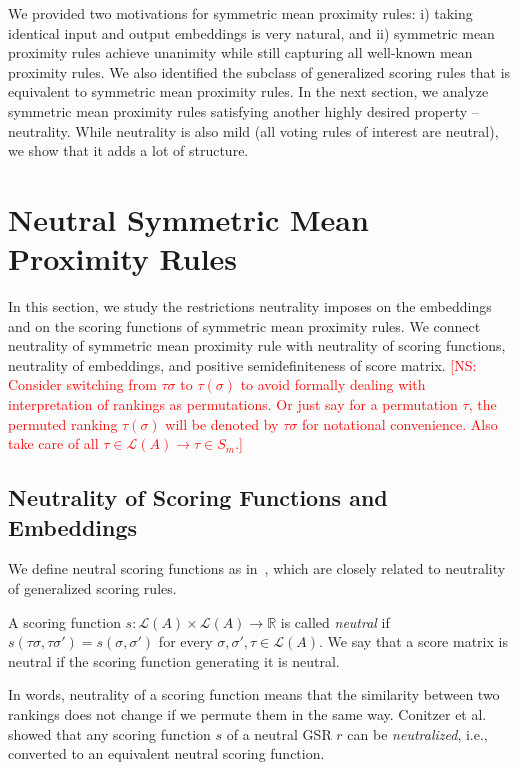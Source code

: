 \documentclass[10pt,letterpaper]{article}
\newcommand{\calL}{{\mathcal{L}}}
\newcommand{\rank}{{\calL(A)}}
\newenvironment{definition}[1][Definition]{\begin{trivlist}
\item[\hskip \labelsep {\bfseries #1}]}{\end{trivlist}}
\newcommand{\kibitz}[2]{\ifnum\Comments=1\textcolor{#1}{#2}\fi}
\newcommand{\cns}[1]{\kibitz{red} {[NS: #1]}}
\begin{document}

We provided two motivations for symmetric mean proximity rules: i) taking identical input and output embeddings is very natural, and ii) symmetric mean proximity rules achieve unanimity while still capturing all well-known mean proximity rules. We also identified the subclass of generalized scoring rules that is equivalent to symmetric mean proximity rules. In the next section, we analyze symmetric mean proximity rules satisfying another highly desired property -- neutrality. While neutrality is also mild (all voting rules of interest are neutral), we show that it adds a lot of structure. 


\section{Neutral Symmetric Mean Proximity Rules}

In this section, we study the restrictions neutrality imposes on the embeddings and on the scoring functions of symmetric mean proximity rules. We connect neutrality of symmetric mean proximity rule with neutrality of scoring functions, neutrality of embeddings, and positive semidefiniteness of score matrix. 
\cns{Consider switching from $\tau \sigma$ to $\tau(\sigma)$ to avoid formally dealing with interpretation of rankings as permutations. Or just say for a permutation $\tau$, the permuted ranking $\tau(\sigma)$ will be denoted by $\tau \sigma$ for notational convenience. Also take care of all $\tau \in \rank \rightarrow \tau \in S_m$.}


\subsection{Neutrality of Scoring Functions and Embeddings}
We define neutral scoring functions as in~\cite{CRX09}, which are closely related to neutrality of generalized scoring rules. 

\begin{definition}[Neutral Scoring Function]
A scoring function $s: \rank \times \rank \rightarrow \mathbb{R}$ is called \emph{neutral} if $s(\tau \sigma, \tau \sigma') = s(\sigma,\sigma')$ for every $\sigma,\sigma',\tau \in \rank$. We say that a score matrix is neutral if the scoring function generating it is neutral. 
\end{definition}
In words, neutrality of a scoring function means that the similarity between two rankings does not change if we permute them in the same way. Conitzer et al.~\cite{CRX09} showed that any scoring function $s$ of a neutral GSR $r$ can be \emph{neutralized}, i.e., converted to an equivalent neutral scoring function.
\end{document}
